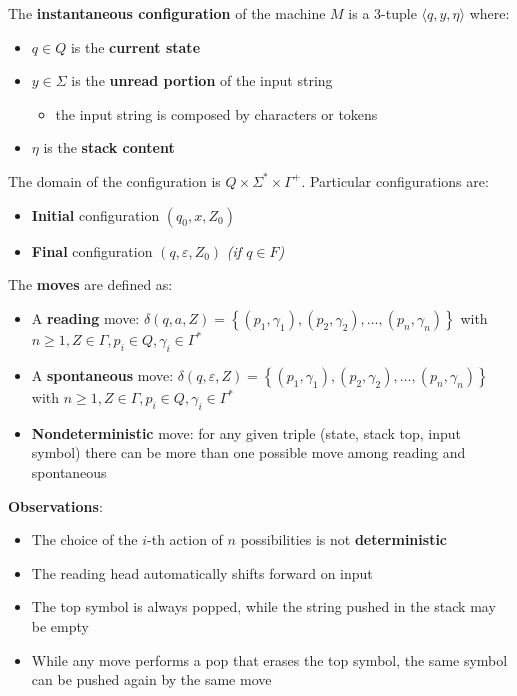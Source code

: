 \documentclass[english]{article}
\begin{document}
\bigskip
The \textbf{instantaneous configuration} of the machine \(M\) is a \(3\)-tuple \(\langle q, y, \eta \rangle\) where:

\begin{itemize}
  \item \(q \in Q\) is the \textbf{current state}
  \item \(y \in \Sigma\) is the \textbf{unread portion} of the input string
        \begin{itemize}
          \item the input string is composed by characters or tokens
        \end{itemize}
  \item \(\eta\) is the \textbf{stack content}
\end{itemize}

The domain of the configuration is \(Q \times \Sigma^\ast \times \Gamma^+\).
Particular configurations are:

\begin{itemize}
  \item \textbf{Initial} configuration \(\left( q_0, x, Z_0 \right)\)
  \item \textbf{Final} configuration \(\left( q, \varepsilon, Z_0 \right)\) \textit{(if \(q \in F\))}
\end{itemize}

\bigskip

The \textbf{moves} are defined as:

\begin{itemize}
  \item A \textbf{reading} move: \(\delta(q, a, Z) = \left\{ (p_1, \gamma_1), (p_2, \gamma_2), \ldots, (p_n, \gamma_n) \right\}\) with \(n \geq 1, Z \in \Gamma, p_i \in Q, \gamma_i \in \Gamma^\ast\)
  \item A \textbf{spontaneous} move: \(\delta(q, \varepsilon, Z) = \left\{ (p_1, \gamma_1), (p_2, \gamma_2), \ldots, (p_n, \gamma_n) \right\}\) with \(n \geq 1, Z \in \Gamma, p_i \in Q, \gamma_i \in \Gamma^\ast\)
  \item \textbf{Nondeterministic} move: for any given triple (state, stack top, input symbol) there can be more than one possible move among reading and spontaneous
\end{itemize}

\textbf{Observations}:

\begin{itemize}
  \item The choice of the \(i\)-th action of \(n\) possibilities is not \textbf{deterministic}
  \item The reading head automatically shifts forward on input
  \item The top symbol is always popped, while the string pushed in the stack may be empty
  \item While any move performs a pop that erases the top symbol, the same symbol can be pushed again by the same move
\end{itemize}
\end{document}
